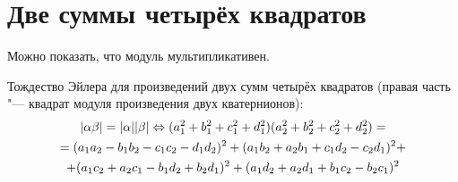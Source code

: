 \section{Две суммы четырёх квадратов}

Можно показать, что модуль мультипликативен.

Тождество Эйлера для произведений двух сумм четырёх квадратов (правая часть "--- квадрат модуля произведения
двух кватернионов):
\begin{gather*}
|\alpha \beta| = |\alpha||\beta| \Leftrightarrow (a_1^2+b_1^2+c_1^2+d_1^2)(a_2^2+b_2^2+c_2^2+d_2^2) = \\
= (a_1a_2 - b_1b_2 - c_1c_2 - d_1d_2)^2 + (a_1b_2 + a_2b_1 + c_1d_2 - c_2d_1)^2 + \\
+ (a_1c_2 + a_2c_1 - b_1d_2 + b_2d_1)^2 + (a_1d_2 + a_2d_1 + b_1c_2 - b_2c_1)^2
\end{gather*}